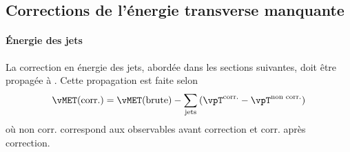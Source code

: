 \subsection{Corrections de l'énergie transverse manquante}\label{chapter-HLO-section-MET-corr}
\paragraph{Énergie des jets}
La correction en énergie des jets, abordée dans les sections suivantes, doit être propagée à \MET.
Cette propagation est faite selon
\begin{equation}
\vMET(\text{corr.}) = \vMET(\text{brute}) - \sum_\text{jets} \left( \vpT^\text{corr.} - \vpT^\text{non corr.} \right)
\end{equation}
où
\og non corr. \fg{} correspond aux observables avant correction
et
\og corr. \fg{} après correction.
